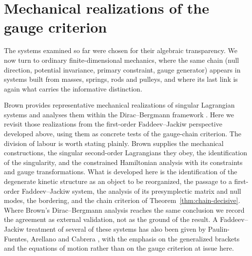 \documentclass[12pt]{article}
\theoremstyle{plain}
\theoremstyle{definition}
\theoremstyle{remark}
\begin{document}
	\section{Mechanical realizations of the gauge criterion}
	\label{sec:mechanical}
	
	The systems examined so far were chosen for their algebraic transparency. We now
	turn to ordinary finite-dimensional mechanics, where the same chain (null
	direction, potential invariance, primary constraint, gauge generator) appears in
	systems built from masses, springs, rods and pulleys, and where its last link is
	again what carries the informative distinction.
	
	Brown provides representative mechanical realizations of singular Lagrangian
	systems and analyses them within the Dirac--Bergmann framework
	\cite{Brown2023}. Here we revisit those realizations from the first-order
	Faddeev--Jackiw perspective developed above, using them as concrete tests of the
	gauge-chain criterion. The division of labour is worth stating plainly. Brown
	supplies the mechanical constructions, the singular second-order Lagrangians
	they obey, the identification of the singularity, and the constrained
	Hamiltonian analysis with its constraints and gauge transformations. What is
	developed here is the identification of the degenerate kinetic structure as an
	object to be reorganized, the passage to a first-order Faddeev--Jackiw system,
	the analysis of its presymplectic matrix and null modes, the bordering, and the
	chain criterion of Theorem~\ref{thm:chain-decisive}. Where Brown's
	Dirac--Bergmann analysis reaches the same conclusion we record the agreement as
	external validation, not as the ground of the result. A Faddeev--Jackiw
	treatment of several of these systems has also been given by Paulin-Fuentes,
	Arellano and Cabrera \cite{PaulinFuentes2024}, with the emphasis on the
	generalized brackets and the equations of motion rather than on the gauge
	criterion at issue here.
	
\end{document}
